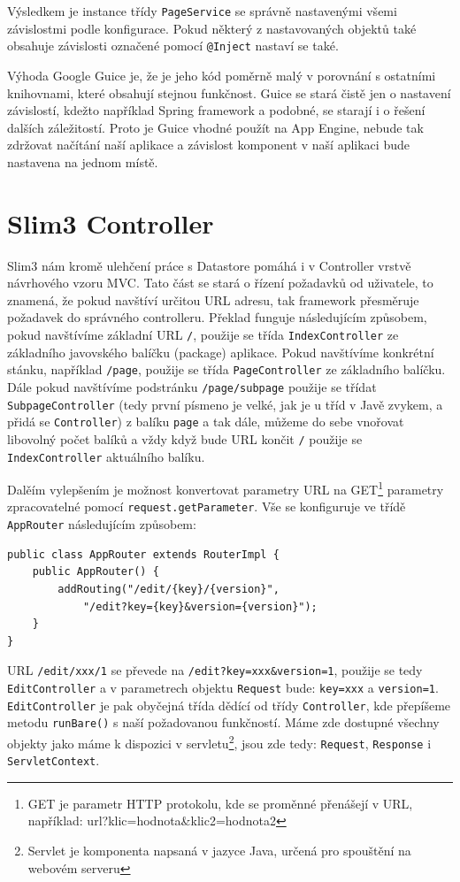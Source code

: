 Výsledkem je instance třídy \verb|PageService| se správně nastavenými všemi závislostmi podle konfigurace. Pokud některý z nastavovaných objektů  také obsahuje závislosti označené pomocí \verb|@Inject| nastaví se také.

Výhoda Google Guice je, že je jeho kód poměrně malý v porovnání s ostatními knihovnami, které obsahují stejnou funkčnost. Guice se stará čistě jen o nastavení závislostí, kdežto například Spring framework a podobné, se starají i o řešení dalších záležitostí. Proto je Guice vhodné použít na App Engine, nebude tak zdržovat načítání naší aplikace a závislost komponent v naší aplikaci bude nastavena na jednom místě.

\section{Slim3 Controller}
Slim3 nám kromě ulehčení práce s Datastore pomáhá i v Controller vrstvě návrhového vzoru MVC. Tato část se stará o řízení požadavků od uživatele, to znamená, že pokud navštíví určitou URL adresu, tak framework přesměruje požadavek do správného controlleru. Překlad funguje následujícím způsobem, pokud navštívíme základní URL \verb|/|, použije se třída \verb|IndexController| ze základního javovského balíčku (package) aplikace. Pokud navštívíme konkrétní stánku, například \verb|/page|, použije se třída \verb|PageController| ze základního balíčku. Dále pokud navštívíme podstránku \verb|/page/subpage| použije se třídat \verb|SubpageController|  (tedy první písmeno je velké, jak je u tříd v Javě zvykem, a přidá se \verb|Controller|) z balíku \verb|page| a tak dále, můžeme do sebe vnořovat libovolný počet balíků a vždy když bude URL končit \verb|/| použije se \verb|IndexController| aktuálního balíku. 

Dalěím vylepšením je možnost konvertovat parametry URL na GET\footnote{GET je parametr HTTP protokolu, kde se proměnné přenášejí v URL, například: url?klic=hodnota\&klic2=hodnota2} parametry zpracovatelné pomocí \verb|request.getParameter|. Vše se konfiguruje ve třídě \verb|AppRouter| následujícím způsobem:

\begin{lstlisting}[caption={Konfigurace nastaveníURL},label=lst:urlConfiguration,belowcaptionskip=0.4cm]
public class AppRouter extends RouterImpl {
	public AppRouter() {
		addRouting("/edit/{key}/{version}", 
			"/edit?key={key}&version={version}");
	}
}
\end{lstlisting}

URL \verb|/edit/xxx/1| se převede na \verb|/edit?key=xxx&version=1|, použije se tedy \verb|EditController| a v parametrech objektu \verb|Request| bude: \verb|key=xxx| a \verb|version=1|. \verb|EditController| je pak obyčejná třída dědící od třídy \verb|Controller|, kde přepíšeme metodu \verb|runBare()| s naší požadovanou funkčností. Máme zde dostupné všechny objekty jako máme k dispozici v servletu\footnote{Servlet je komponenta napsaná v jazyce Java, určená pro spouštění na webovém serveru}, jsou zde tedy: \verb|Request|, \verb|Response| i \verb|ServletContext|.

